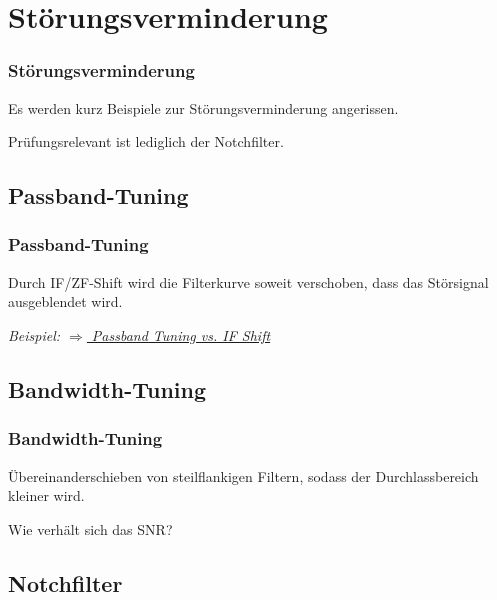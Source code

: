 \section[Störungsverm.]{Störungsverminderung}

\begin{frame}
    \frametitle{Störungsverminderung}

    Es werden kurz Beispiele zur Störungsverminderung angerissen.

    \bigskip

    Prüfungsrelevant ist lediglich der Notchfilter.

\end{frame}

\subsection{Passband-Tuning}

\begin{frame}
    \frametitle{Passband-Tuning}

    Durch IF/ZF-Shift wird die Filterkurve soweit verschoben, dass das
    Störsignal ausgeblendet wird.

    \bigskip

    \emph{Beispiel: \href{https://youtu.be/NnhZbAKXm28}{$\Rightarrow$ Passband Tuning vs. IF Shift}}

\end{frame}

\subsection{Bandwidth-Tuning}

\begin{frame}
    \frametitle{Bandwidth-Tuning}

    Übereinanderschieben von steilflankigen Filtern, sodass der
    Durchlassbereich kleiner wird.


    \bigskip

    Wie verhält sich das SNR?

\end{frame}

\subsection{Notchfilter}

